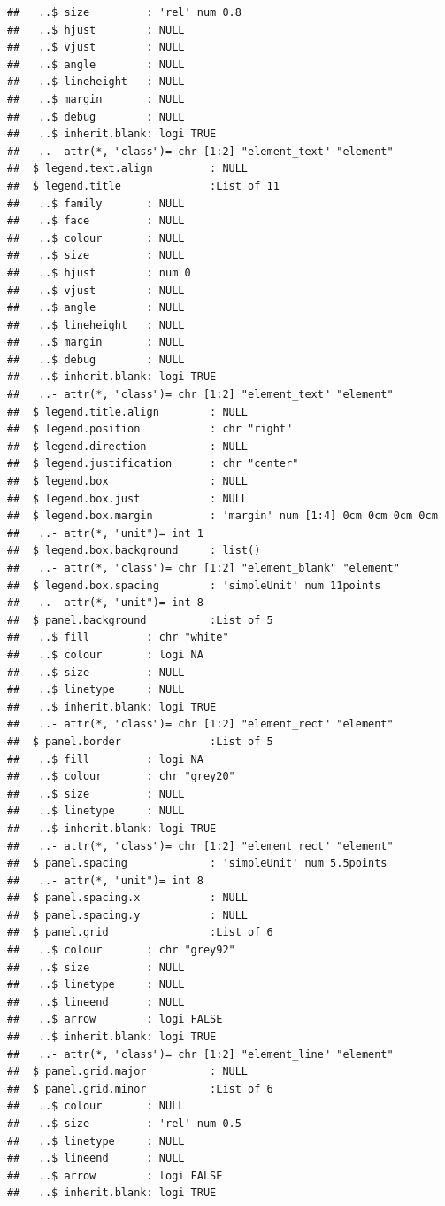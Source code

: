 \documentclass{article}\usepackage[]{graphicx}\usepackage[]{color}
\makeatletter
\newenvironment{kframe}{%
 \def\at@end@of@kframe{}%
 \ifinner\ifhmode%
  \def\at@end@of@kframe{\end{minipage}}%
  \begin{minipage}{\columnwidth}%
 \fi\fi%
 \def\FrameCommand##1{\hskip\@totalleftmargin \hskip-\fboxsep
 \colorbox{shadecolor}{##1}\hskip-\fboxsep
     \hskip-\linewidth \hskip-\@totalleftmargin \hskip\columnwidth}%
 \MakeFramed {\advance\hsize-\width
   \@totalleftmargin\z@ \linewidth\hsize
   \@setminipage}}%
 {\par\unskip\endMakeFramed%
 \at@end@of@kframe}
\newenvironment{knitrout}{}{} %
\makeatother
\begin{document}
\begin{enumerate}
\begin{enumerate}
\begin{knitrout}
\begin{kframe}
\begin{verbatim}
##   ..$ size         : 'rel' num 0.8
##   ..$ hjust        : NULL
##   ..$ vjust        : NULL
##   ..$ angle        : NULL
##   ..$ lineheight   : NULL
##   ..$ margin       : NULL
##   ..$ debug        : NULL
##   ..$ inherit.blank: logi TRUE
##   ..- attr(*, "class")= chr [1:2] "element_text" "element"
##  $ legend.text.align         : NULL
##  $ legend.title              :List of 11
##   ..$ family       : NULL
##   ..$ face         : NULL
##   ..$ colour       : NULL
##   ..$ size         : NULL
##   ..$ hjust        : num 0
##   ..$ vjust        : NULL
##   ..$ angle        : NULL
##   ..$ lineheight   : NULL
##   ..$ margin       : NULL
##   ..$ debug        : NULL
##   ..$ inherit.blank: logi TRUE
##   ..- attr(*, "class")= chr [1:2] "element_text" "element"
##  $ legend.title.align        : NULL
##  $ legend.position           : chr "right"
##  $ legend.direction          : NULL
##  $ legend.justification      : chr "center"
##  $ legend.box                : NULL
##  $ legend.box.just           : NULL
##  $ legend.box.margin         : 'margin' num [1:4] 0cm 0cm 0cm 0cm
##   ..- attr(*, "unit")= int 1
##  $ legend.box.background     : list()
##   ..- attr(*, "class")= chr [1:2] "element_blank" "element"
##  $ legend.box.spacing        : 'simpleUnit' num 11points
##   ..- attr(*, "unit")= int 8
##  $ panel.background          :List of 5
##   ..$ fill         : chr "white"
##   ..$ colour       : logi NA
##   ..$ size         : NULL
##   ..$ linetype     : NULL
##   ..$ inherit.blank: logi TRUE
##   ..- attr(*, "class")= chr [1:2] "element_rect" "element"
##  $ panel.border              :List of 5
##   ..$ fill         : logi NA
##   ..$ colour       : chr "grey20"
##   ..$ size         : NULL
##   ..$ linetype     : NULL
##   ..$ inherit.blank: logi TRUE
##   ..- attr(*, "class")= chr [1:2] "element_rect" "element"
##  $ panel.spacing             : 'simpleUnit' num 5.5points
##   ..- attr(*, "unit")= int 8
##  $ panel.spacing.x           : NULL
##  $ panel.spacing.y           : NULL
##  $ panel.grid                :List of 6
##   ..$ colour       : chr "grey92"
##   ..$ size         : NULL
##   ..$ linetype     : NULL
##   ..$ lineend      : NULL
##   ..$ arrow        : logi FALSE
##   ..$ inherit.blank: logi TRUE
##   ..- attr(*, "class")= chr [1:2] "element_line" "element"
##  $ panel.grid.major          : NULL
##  $ panel.grid.minor          :List of 6
##   ..$ colour       : NULL
##   ..$ size         : 'rel' num 0.5
##   ..$ linetype     : NULL
##   ..$ lineend      : NULL
##   ..$ arrow        : logi FALSE
##   ..$ inherit.blank: logi TRUE

\end{verbatim}
\end{kframe}
\end{knitrout}
\end{enumerate}
\end{enumerate}
\end{document}
